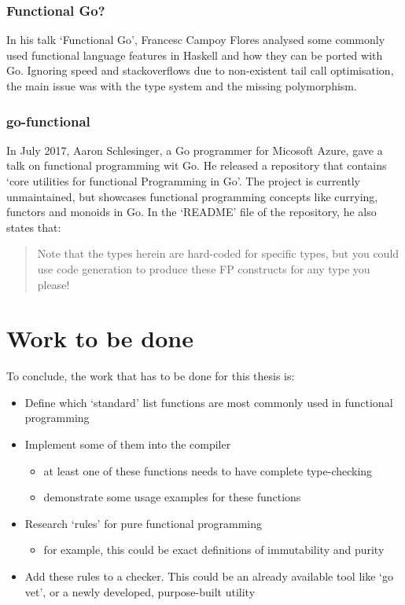 \subsubsection{Functional Go?}

In his talk `Functional Go'\autocite{func-go-talk}, Francesc Campoy Flores analysed some commonly used functional
language features in Haskell and how they can be ported with Go. Ignoring speed and stackoverflows due to non-existent
tail call optimisation\autocite{go-tco}, the main issue was with the type system and the missing polymorphism.

\subsubsection{go-functional}

In July 2017, Aaron Schlesinger, a Go programmer for Micosoft Azure, gave a talk on functional programming wit Go.
He released a repository\autocite{go-functional} that contains `core utilities for functional Programming in Go'.
The project is currently unmaintained, but showcases functional programming concepts like currying, functors and
monoids in Go.
In the `README' file of the repository, he also states that:
\begin{quote}
    Note that the types herein are hard-coded for specific types, but you could use code generation to produce these FP constructs for any type you please!
\end{quote}

\section{Work to be done} %

To conclude, the work that has to be done for this thesis is:

\begin{itemize}
    \item Define which `standard' list functions are most commonly used in functional programming
    \item Implement some of them into the compiler
    \begin{itemize}
        \item at least one of these functions needs to have complete type-checking
        \item demonstrate some usage examples for these functions
    \end{itemize}
    \item Research `rules' for pure functional programming
    \begin{itemize}
        \item for example, this could be exact definitions of immutability and purity
    \end{itemize}
    \item Add these rules to a checker. This could be an already available tool like `go vet', or a newly
    developed, purpose-built utility
\end{itemize}

